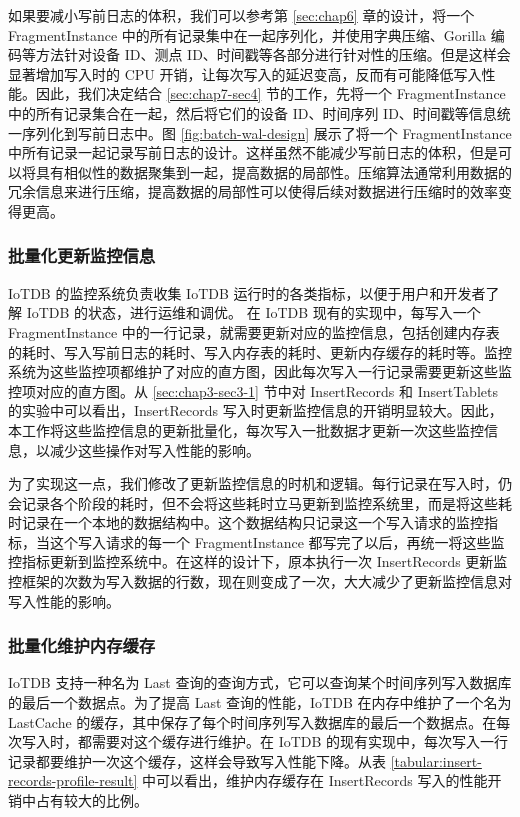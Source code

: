  如果要减小写前日志的体积，我们可以参考第 \ref{sec:chap6} 章的设计，将一个 FragmentInstance 中的所有记录集中在一起序列化，并使用字典压缩、Gorilla 编码等方法针对设备 ID、测点 ID、时间戳等各部分进行针对性的压缩。但是这样会显著增加写入时的 CPU 开销，让每次写入的延迟变高，反而有可能降低写入性能。因此，我们决定结合 \ref{sec:chap7-sec4} 节的工作，先将一个 FragmentInstance 中的所有记录集合在一起，然后将它们的设备 ID、时间序列 ID、时间戳等信息统一序列化到写前日志中。图 \ref{fig:batch-wal-design} 展示了将一个 FragmentInstance 中所有记录一起记录写前日志的设计。这样虽然不能减少写前日志的体积，但是可以将具有相似性的数据聚集到一起，提高数据的局部性。压缩算法通常利用数据的冗余信息来进行压缩，提高数据的局部性可以使得后续对数据进行压缩时的效率变得更高。
\subsubsection{批量化更新监控信息}
 IoTDB 的监控系统负责收集 IoTDB 运行时的各类指标，以便于用户和开发者了解 IoTDB 的状态，进行运维和调优。
 在 IoTDB 现有的实现中，每写入一个 FragmentInstance 中的一行记录，就需要更新对应的监控信息，包括创建内存表的耗时、写入写前日志的耗时、写入内存表的耗时、更新内存缓存的耗时等。监控系统为这些监控项都维护了对应的直方图，因此每次写入一行记录需要更新这些监控项对应的直方图。从 \ref{sec:chap3-sec3-1} 节中对 InsertRecords 和 InsertTablets 的实验中可以看出，InsertRecords 写入时更新监控信息的开销明显较大。因此，本工作将这些监控信息的更新批量化，每次写入一批数据才更新一次这些监控信息，以减少这些操作对写入性能的影响。

 为了实现这一点，我们修改了更新监控信息的时机和逻辑。每行记录在写入时，仍会记录各个阶段的耗时，但不会将这些耗时立马更新到监控系统里，而是将这些耗时记录在一个本地的数据结构中。这个数据结构只记录这一个写入请求的监控指标，当这个写入请求的每一个 FragmentInstance 都写完了以后，再统一将这些监控指标更新到监控系统中。在这样的设计下，原本执行一次 InsertRecords 更新监控框架的次数为写入数据的行数，现在则变成了一次，大大减少了更新监控信息对写入性能的影响。

\subsubsection{批量化维护内存缓存}
IoTDB 支持一种名为 Last 查询的查询方式，它可以查询某个时间序列写入数据库的最后一个数据点。为了提高 Last 查询的性能，IoTDB 在内存中维护了一个名为 LastCache 的缓存，其中保存了每个时间序列写入数据库的最后一个数据点。在每次写入时，都需要对这个缓存进行维护。在 IoTDB 的现有实现中，每次写入一行记录都要维护一次这个缓存，这样会导致写入性能下降。从表 \ref{tabular:insert-records-profile-result} 中可以看出，维护内存缓存在 InsertRecords 写入的性能开销中占有较大的比例。

